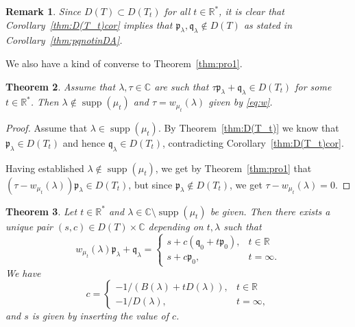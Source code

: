 \documentclass [12pt]{article}
\newtheorem{thm}{Theorem}[section]
\newtheorem{rem}[thm]{Remark}
\DeclareMathOperator{\supp}{supp}
\newcommand{\C}{\mathbb{C}}
\newcommand{\R}{\mathbb{R}}
\newcommand{\la}{\lambda}
\begin{document}
\begin{rem}\label{thm:notin}{\rm Since $D(T)\subset D(T_t)$ for all $t\in\R^*$, it is clear that Corollary~\ref{thm:D(T_t)cor} implies that $\mathfrak{p}_\la, \mathfrak{q}_\la\notin D(T)$ as stated in Corollary~\ref{thm:pqnotinDA}.
}
\end{rem}

We also have a kind of converse to Theorem~\ref{thm:pro1}.

\begin{thm}\label{thm:pro2} Assume that $\la,\tau\in\C$ are such that $\tau\mathfrak{p}_\la +\mathfrak{q}_\la\in D(T_t)$ for some $t\in\R^*$. Then $\la\notin \supp(\mu_t)$ and 
$\tau=w_{\mu_t}(\la)$ given by \eqref{eq:w}.
\end{thm}

\begin{proof} Assume that $\la\in\supp(\mu_t)$. By Theorem~\ref{thm:D(T_t)} we know that $\mathfrak{p}_\la\in D(T_t)$ and hence $\mathfrak{q}_\la\in D(T_t)$, contradicting Corollary~\ref{thm:D(T_t)cor}.

Having established $\la\notin\supp(\mu_t)$, we get by Theorem~\ref{thm:pro1} that $(\tau-w_{\mu_t}(\la))\mathfrak{p}_\la\in D(T_t)$, but since
 $\mathfrak{p}_\la\notin D(T_t)$, we get 
$\tau-w_{\mu_t}(\la)=0$.
\end{proof}

 \begin{thm}\label{thm:DT} Let $t\in\R^*$ and $\la\in \C\setminus \supp(\mu_t)$ be given.
 Then there exists a unique pair $(s,c)\in D(T)\times \C$ depending on $t,\la$ such that 
\begin{equation*}
 w_{\mu_t}(\lambda)\mathfrak{p}_\lambda+\mathfrak{q}_\lambda
 =\left\{\begin{array}{ll}
 s +c(\mathfrak{q}_0+t\mathfrak{p}_0), &   t\in\R\\
  s +c\mathfrak{p}_0, & t=\infty.
  \end{array}
  \right.
 \end{equation*}
 We have
 \begin{equation*}
 c=\left\{\begin{array}{ll}
 -1/(B(\la)+tD(\la)), & t\in\R \\
  -1/D(\la), & t=\infty,
    \end{array}
  \right.
  \end{equation*}
   and $s$ is given by inserting the value of $c$.
 \end{thm}
  
\end{document}

